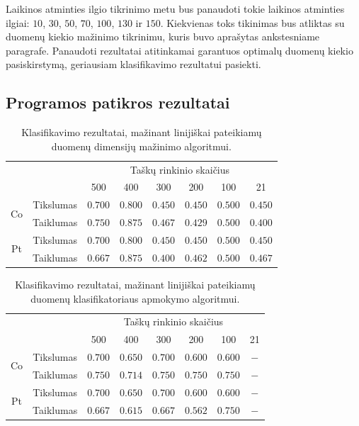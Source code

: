 \documentclass[]{vgtuef}
\begin{document}
Laikinos atminties ilgio tikrinimo metu bus panaudoti tokie laikinos atminties ilgiai: $10$, $30$, $50$, $70$, $100$, $130$ ir $150$. Kiekvienas toks tikinimas bus atliktas su duomenų kiekio mažinimo tikrinimu, kuris buvo aprašytas ankstesniame paragrafe. Panaudoti rezultatai atitinkamai garantuos optimalų duomenų kiekio pasiskirstymą, geriausiam klasifikavimo rezultatui pasiekti.


\subsection{Programos patikros rezultatai}
\begin{table}
	\centering
	\caption{Klasifikavimo rezultatai, mažinant linijiškai pateikiamų duomenų dimensijų mažinimo algoritmui.}
	\label{table:first_phase_experiment}
	\begin{tabular}{|c|c|c|c|c|c|c|c|} \hline
			& & \multicolumn{6}{c|}{Taškų rinkinio skaičius} \\ \cline{3-8}
						&	& 500 	& 400	& 300 	& 200 & 100 	& 21 	\\ \hline
		\multirow{2}{*}{Co}
		& Tikslumas	& $0.700$ & $\mathbf{0.800}$	 & $0.450$ & $0.450$ & $0.500$ & $0.450$ \\ \cline{2-8}
		& Taiklumas  &	$0.750$ & $\mathbf{0.875}$ & $0.467$ & $0.429$ & $0.500$ & $0.400$ \\ \hline
		\multirow{2}{*}{Pt}
		& Tikslumas	& $0.700$ & $\mathbf{0.800}$	 & $0.450$ & $0.450$ & $0.500$ & $0.450$ \\ \cline{2-8}
		& Taiklumas  &	$0.667$ & $\mathbf{0.875}$ & $0.400$ & $0.462$ & $0.500$ & $0.467$ \\ \hline
	\end{tabular}
\end{table}

\begin{table}
	\centering
	\caption{Klasifikavimo rezultatai, mažinant linijiškai pateikiamų duomenų klasifikatoriaus apmokymo algoritmui.}
	\label{table:second_phase_experiment}
	\begin{tabular}{|c|c|c|c|c|c|c|c|} \hline
			& & \multicolumn{6}{c|}{Taškų rinkinio skaičius} \\ \cline{3-8}
						&	& 500 	& 400	& 300 	& 200 & 100 	& 21 	\\ \hline
		\multirow{2}{*}{Co}
		& Tikslumas	& $\mathbf{0.700}$ & $0.650$ & $\mathbf{0.700}$ & $0.600$ & $0.600$ & $-$ \\ \cline{2-8}
		& Taiklumas  &	$\mathbf{0.750}$ & $0.714$ & $\mathbf{0.750}$ & $0.750$ & $0.750$ & $-$ \\ \hline
		\multirow{2}{*}{Pt}
		& Tikslumas	& $\mathbf{0.700}$ & $0.650$ & $\mathbf{0.700}$ & $0.600$ & $0.600$ & $-$ \\ \cline{2-8}
		& Taiklumas  &	$\mathbf{0.667}$ & $0.615$ & $\mathbf{0.667}$ & $0.562$ & $0.750$ & $-$ \\ \hline
	\end{tabular}
\end{table}
\end{document}
